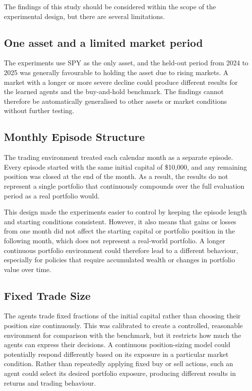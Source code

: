 The findings of this study should be considered within the scope of the
experimental design, but there are several limitations.

\subsection{One asset and a limited market period}

The experiments use SPY as the only asset, and the held-out period from
2024 to 2025 was generally favourable to holding the asset due to rising
markets. A market with a longer or more severe decline could produce
different results for the learned agents and the buy-and-hold benchmark.
The findings cannot therefore be automatically generalised to other
assets or market conditions without further testing.

\subsection{Monthly Episode Structure}

The trading environment treated each calendar month as a separate
episode. Every episode started with the same initial capital of
\$10,000, and any remaining position was closed at the end of the month.
As a result, the results do not represent a single portfolio that
continuously compounds over the full evaluation period as a real
portfolio would.

This design made the experiments easier to control by keeping the
episode length and starting conditions consistent. However, it also
means that gains or losses from one month did not affect the starting
capital or portfolio position in the following month, which does not
represent a real-world portfolio. A longer continuous portfolio
environment could therefore lead to a different behaviour, especially
for policies that require accumulated wealth or changes in portfolio
value over time.

\subsection{Fixed Trade Size}

The agents trade fixed fractions of the initial capital rather than
choosing their position size continuously. This was calibrated to create
a controlled, reasonable environment for comparison with the benchmark,
but it restricts how much the agents can express their decisions. A
continuous position-sizing model could potentially respond differently
based on its exposure in a particular market condition. Rather than
repeatedly applying fixed buy or sell actions, such an agent could
select its desired portfolio exposure, producing different results in
returns and trading behaviour.

